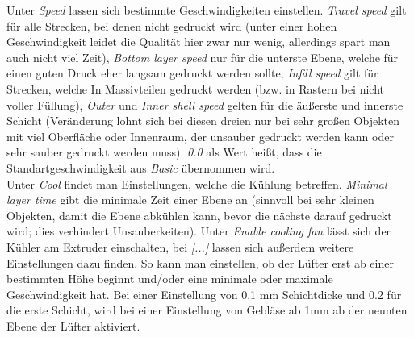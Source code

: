 \documentclass[11pt,a4paper]{scrartcl}
\begin{document}
Unter \textit{Speed} lassen sich bestimmte Geschwindigkeiten einstellen. \textit{Travel speed} gilt für alle Strecken, bei denen nicht gedruckt wird (unter einer hohen Geschwindigkeit leidet die Qualität hier zwar nur wenig, allerdings spart man auch nicht viel Zeit), \textit{Bottom layer speed} nur für die unterste Ebene, welche für einen guten Druck eher langsam gedruckt werden sollte, \textit{Infill speed} gilt für Strecken, welche In Massivteilen gedruckt werden (bzw. in Rastern bei nicht voller Füllung), \textit{Outer} und \textit{Inner shell speed} gelten für die äußerste und innerste Schicht (Veränderung lohnt sich bei diesen dreien nur bei sehr großen Objekten mit viel Oberfläche oder Innenraum, der unsauber gedruckt werden kann oder sehr sauber gedruckt werden muss). \textit{0.0} als Wert heißt, dass die Standartgeschwindigkeit aus \textit{Basic} übernommen wird. \\
Unter \textit{Cool} findet man Einstellungen, welche die Kühlung betreffen. \textit{Minimal layer time} gibt die minimale Zeit einer Ebene an (sinnvoll bei sehr kleinen Objekten, damit die Ebene abkühlen kann, bevor die nächste darauf gedruckt wird; dies verhindert Unsauberkeiten). Unter \textit{Enable cooling fan} lässt sich der Kühler am Extruder einschalten, bei \textit{[...]} lassen sich außerdem weitere Einstellungen dazu finden. So kann man einstellen, ob der Lüfter erst ab einer bestimmten Höhe beginnt und/oder eine minimale oder maximale Geschwindigkeit hat. Bei einer Einstellung von 0.1 mm Schichtdicke und 0.2 für die erste Schicht, wird bei einer Einstellung von Gebläse ab 1mm ab der neunten Ebene der Lüfter aktiviert.
\end{document}
